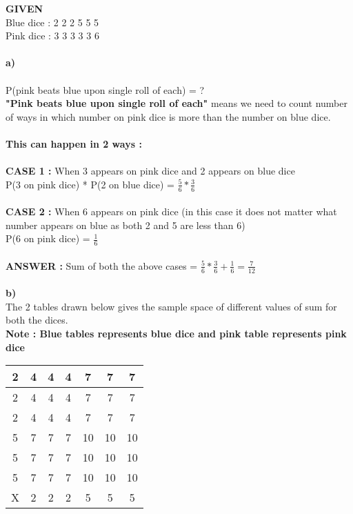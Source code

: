 \documentclass[14pt, letterpaper]{article}
\begin{document}
 \textbf{GIVEN}\\
Blue dice : 2 2 2 5 5 5\\
Pink dice : 3 3 3 3 3 6\\ \\
\textbf{a)}\\ \\
P(pink beats blue upon single roll of each) = ? \\
\textbf{"Pink beats blue upon single roll of each"} means we need to count number of ways in which number on pink dice is more than the number on blue dice. \\
\\  
\textbf{This can happen in 2 ways : }\\ \\
\textbf{CASE 1 : } When 3 appears on pink dice and 2 appears on blue dice\\
P(3 on pink dice) * P(2 on blue dice) = $\frac{5}{6} * \frac{3}{6}$ \\ \\
\textbf{CASE 2 : } When 6 appears on pink dice (in this case it does not matter what number appears on blue as both 2 and 5 are less than 6)\\
P(6 on pink dice) = $\frac{1}{6}$ \\ \\
\textbf{ANSWER : }Sum of both the above cases = $\frac{5}{6} * \frac{3}{6} + \frac{1}{6} = \frac{7}{12}$
\\ \\
\textbf{b)}\\ 
The 2 tables drawn below gives the sample space of different values of sum for both the dices.\\
\textbf{Note : Blue tables represents blue dice and pink table represents pink dice}\\
    \begin{tabular}{|c|c|c|c|c|c|c|}
        \hline
        \cellcolor[HTML]{A1CAF1}2 & 4 & 4 & 4 & 7 & 7 & 7\\
        \hline
        \cellcolor[HTML]{A1CAF1}2 & 4 & 4 & 4 & 7 & 7 & 7\\    
        \hline
        \cellcolor[HTML]{A1CAF1}2 & 4 & 4 & 4 & 7 & 7 & 7\\ 
        \hline
        \cellcolor[HTML]{A1CAF1}5 & 7 & 7 & 7 & 10 & 10 & 10\\
        \hline
        \cellcolor[HTML]{A1CAF1}5 & 7 & 7 & 7 & 10 & 10 & 10\\
        \hline
        \cellcolor[HTML]{A1CAF1}5 & 7 & 7 & 7 & 10 & 10 & 10\\
        \hline
        \rowcolor[HTML]{A1CAF1} X & 2 & 2 & 2 & 5 & 5 & 5\\
        \hline
    \end{tabular} 
\end{document}
